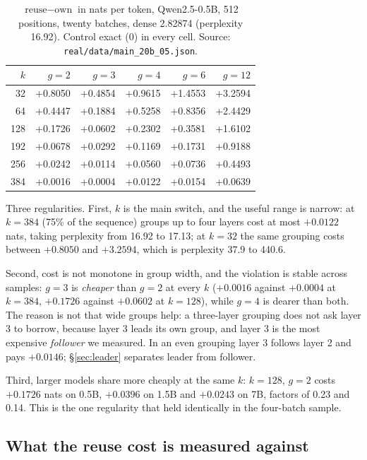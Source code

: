 \documentclass[10pt]{article}
\begin{document}
\begin{table}[h]
\centering
\caption{$\text{reuse}-\text{own}$ in nats per token, Qwen2.5-0.5B, 512
positions, twenty batches, dense 2.82874 (perplexity 16.92). Control exact
($0$) in every cell. Source: \texttt{real/data/main\_20b\_05.json}.}
\label{tab:grid}
\begin{tabular}{rrrrrr}
\toprule
$k$ & $g{=}2$ & $g{=}3$ & $g{=}4$ & $g{=}6$ & $g{=}12$ \\
\midrule
32  & +0.8050 & +0.4854 & +0.9615 & +1.4553 & +3.2594 \\
64  & +0.4447 & +0.1884 & +0.5258 & +0.8356 & +2.4429 \\
128 & +0.1726 & +0.0602 & +0.2302 & +0.3581 & +1.6102 \\
192 & +0.0678 & +0.0292 & +0.1169 & +0.1731 & +0.9188 \\
256 & +0.0242 & +0.0114 & +0.0560 & +0.0736 & +0.4493 \\
384 & +0.0016 & +0.0004 & +0.0122 & +0.0154 & +0.0639 \\
\bottomrule
\end{tabular}
\end{table}

Three regularities. First, $k$ is the main switch, and the useful range is
narrow: at $k=384$ (75\% of the sequence) groups up to four layers cost at
most $+0.0122$ nats, taking perplexity from 16.92 to 17.13; at $k=32$ the
same grouping costs between $+0.8050$ and $+3.2594$, which is perplexity 37.9
to 440.6.

Second, cost is not monotone in group width, and the violation is stable
across samples: $g{=}3$ is \emph{cheaper} than $g{=}2$ at every $k$
($+0.0016$ against $+0.0004$ at $k=384$, $+0.1726$ against $+0.0602$ at
$k=128$), while $g{=}4$ is dearer than both. The reason is not that wide
groups help: a three-layer grouping does not ask layer 3 to borrow, because
layer 3 leads its own group, and layer 3 is the most expensive
\emph{follower} we measured. In an even grouping layer 3 follows layer 2 and
pays $+0.0146$; \S\ref{sec:leader} separates leader from follower.

Third, larger models share more cheaply at the same $k$: $k{=}128$, $g{=}2$
costs $+0.1726$ nats on 0.5B, $+0.0396$ on 1.5B and $+0.0243$ on 7B, factors
of 0.23 and 0.14. This is the one regularity that held identically in the
four-batch sample.

\subsection{What the reuse cost is measured against}
\end{document}
